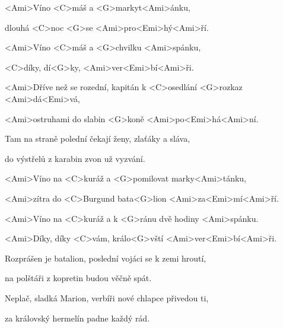

<Ami>Víno <C>máš a <G>markyt<Ami>ánku,

dlouhá <C>noc <G>se <Ami>pro<Emi>hý<Ami>ří.

<Ami>Víno <C>máš a <G>chvilku <Ami>spánku,

<C>díky, dí<G>ky, <Ami>ver<Emi>bí<Ami>ři.

\zs
<Ami>Dříve než se rozední,
kapitán k <C>osedlání <G>rozkaz <Ami>dá<Emi>vá,

<Ami>ostruhami do slabin <G>koně <Ami>po<Emi>há<Ami>ní.

Tam na straně polední
čekají ženy, zlaťáky a sláva,

do výstřelů z karabin zvon už vyzvání.
\ks

\zr
<Ami>Víno na <C>kuráž a <G>pomilovat marky<Ami>tánku,

<Ami>zítra do <C>Burgund bata<G>lion 
<Ami>za<Emi>mí<Ami>ří.

<Ami>Víno na <C>kuráž a k <G>ránu dvě hodiny <Ami>spánku.

<Ami>Díky, díky <C>vám, králo<G>vští 
<Ami>ver<Emi>bí<Ami>ři.
\kr

\zs
Rozprášen je batalion,
poslední vojáci se k zemi hroutí,

na polštáři z kopretin budou věčně spát.

Neplač, sladká Marion,
verbíři nové chlapce přivedou ti,

za královský hermelín padne každý rád.
\ks

\zr \kr

\kp





